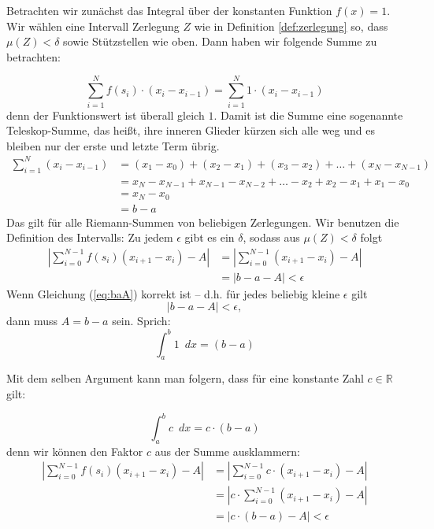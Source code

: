 Betrachten wir zunächst das Integral über der konstanten Funktion $f(x)=1$. Wir wählen eine Intervall Zerlegung $Z$ wie in Definition \ref{def:zerlegung} so, dass $\mu(Z)<\delta$ sowie Stützstellen wie oben. Dann haben wir folgende Summe zu betrachten:

\begin{equation}
\sum_{i=1}^{N} f(s_i)\cdot (x_{i}-x_{i-1}) = \sum_{i=1}^{N} 1\cdot (x_{i}-x_{i-1})
\end{equation}
denn der Funktionswert ist überall gleich $1$. Damit ist die Summe eine sogenannte Teleskop-Summe, das heißt, ihre inneren Glieder kürzen sich alle weg und es bleiben nur der erste und letzte Term übrig.
\begin{equation}
\begin{split}
\sum_{i=1}^{N} (x_{i}-x_{i-1}) &=(x_1-x_0)+(x_2-x_1)+(x_3-x_2)+\dots +(x_N-x_{N-1}) \\
&= x_N-x_{N-1}+x_{N-1}-x_{N-2}+ \dots -x_2+x_2-x_1+x_1-x_0 \\
&= x_N-x_0\\
&=b-a
\end{split}
\end{equation}
Das gilt für alle Riemann-Summen von beliebigen Zerlegungen. Wir benutzen die Definition des Intervalls: Zu jedem $\epsilon$ gibt es ein $\delta$, sodass aus $\mu(Z)<\delta$ folgt
\begin{equation}\label{eq:baA}
\begin{split}
\left| \sum_{i=0}^{N-1} f(s_i)(x_{i+1}-x_i) -A \right| &= \left| \sum_{i=0}^{N-1} (x_{i+1}-x_i) -A \right| \\ 
&=\left| b-a - A \right| < \epsilon
\end{split}
\end{equation}
Wenn Gleichung (\ref{eq:baA}) korrekt ist -- d.h. für jedes beliebig kleine $\epsilon$ gilt 
\begin{equation}
|b-a-A|<\epsilon,
\end{equation}
dann muss $A=b-a$ sein. Sprich:
\begin{equation}
\int_a^b 1 \enspace dx = (b-a)
\end{equation}

Mit dem selben Argument kann man folgern, dass für eine konstante Zahl $c\in \mathbb{R}$ gilt:

\begin{equation}
\int_a^b c \enspace dx = c\cdot(b-a)
\end{equation}
denn wir können den Faktor $c$ aus der Summe ausklammern:
\begin{equation}
\begin{split}
\left| \sum_{i=0}^{N-1} f(s_i)(x_{i+1}-x_i) -A \right| &= \left| \sum_{i=0}^{N-1} c\cdot (x_{i+1}-x_i) -A \right| \\ 
&=\left| c\cdot \sum_{i=0}^{N-1} (x_{i+1}-x_i) -A \right|\\
&=\left| c\cdot (b-a) -A \right| < \epsilon
\end{split}
\end{equation}

